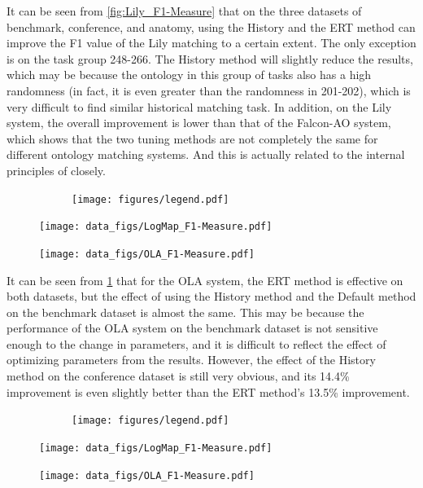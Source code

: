 \documentclass[twoside]{article}
\begin{document}
It can be seen from \ref{fig:Lily_F1-Measure} that on the three datasets of benchmark, conference, and anatomy, using the History and the ERT method can improve the F1 value of the Lily matching to a certain extent. The only exception is on the task group 248-266. The History method will slightly reduce the results, which may be because the ontology in this group of tasks also has a high randomness (in fact, it is even greater than the randomness in 201-202), which is very difficult to find similar historical matching task.
In addition, on the Lily system, the overall improvement is lower than that of the Falcon-AO system, which shows that the two tuning methods are not completely the same for different ontology matching systems. And this is actually related to the internal principles of closely.

\begin{figure}[htb!]\centering
\begin{subfigure}{\textwidth}
	\centering
	\texttt{[image: figures/legend.pdf]}
\end{subfigure}
\begin{minipage}{0.49\textwidth}
	\centering
	\texttt{[image: data\_figs/LogMap\_F1-Measure.pdf]}
	\label{fig:LogMap_F1-Measure}
\end{minipage}
\begin{minipage}{0.49\textwidth}
	\centering
	\texttt{[image: data\_figs/OLA\_F1-Measure.pdf]}
	\label{fig:OLA_F1-Measure}
\end{minipage}
\end{figure}

It can be seen from \ref{fig:OLA_F1-Measure} that for the OLA system, the ERT method is effective on both datasets, but the effect of using the History method and the Default method on the benchmark dataset is almost the same.
This may be because the performance of the OLA system on the benchmark dataset is not sensitive enough to the change in parameters, and it is difficult to reflect the effect of optimizing parameters from the results.
However, the effect of the History method on the conference dataset is still very obvious, and its 14.4\% improvement is even slightly better than the ERT method's 13.5\% improvement.

\begin{figure}[htb!]\centering
\begin{subfigure}{\textwidth}
	\centering
	\texttt{[image: figures/legend.pdf]}
\end{subfigure}
\begin{minipage}{0.49\textwidth}
	\centering
	\texttt{[image: data\_figs/LogMap\_F1-Measure.pdf]}
	\label{fig:RiMOM_F1-Measure}
\end{minipage}
\begin{minipage}{0.49\textwidth}
	\centering
	\texttt{[image: data\_figs/OLA\_F1-Measure.pdf]}
	\label{fig:XMap_F1-Measure}
\end{minipage}
\end{figure}
\end{document}

